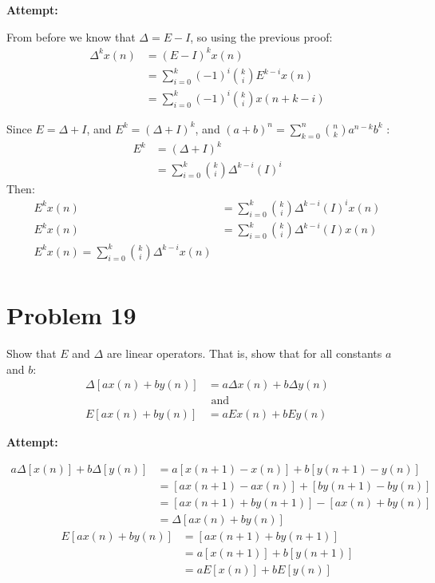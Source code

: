\documentclass[12pt,letterpaper]{article}
\theoremstyle{definition}
\begin{document}
\textbf{Attempt:}
\begin{changemargin}{.5cm}{0cm}
    From before we know that $\Delta = E-I$, so using the previous proof:
    \begin{align*}
        \Delta^kx(n)&=(E-I)^kx(n)\\
        &=\sum_{i=0}^k(-1)^i{k\choose i}E^{k-i}x(n)\\
        &=\sum_{i=0}^k(-1)^i{k\choose i}x(n+k-i)
    \end{align*}

    Since $E=\Delta + I$, and $E^k= (\Delta + I)^k$, and $\displaystyle (a+b)^n = \sum_{k=0}^n {n\choose k} a^{n-k}b^k$ :
    \begin{align*}
        E^k&=(\Delta + I)^k\\
        &=\sum_{i=0}^k{k \choose i} \Delta^{k-i}(I)^i
    \end{align*}
    Then:
    \begin{align*}
        E^kx(n) &=\sum_{i=0}^k{k \choose i} \Delta^{k-i}(I)^ix(n)\\
        E^kx(n) &=\sum_{i=0}^k{k \choose i} \Delta^{k-i}(I)x(n)\\
        E^kx(n) =\sum_{i=0}^k{k \choose i} \Delta^{k-i}x(n)\\
    \end{align*}
\end{changemargin}

\section*{Problem 19}
Show that $E$ and $\Delta$ are linear operators. That is, show that for all constants $a$ and $b$:
\begin{align*}
    \Delta[ax(n)+by(n)] &=a\Delta x(n) + b\Delta y(n)\\
    &\text{ and}\\
    E[ax(n) + by(n)]&= aEx(n) + bEy(n)
\end{align*}

\textbf{Attempt:}

\begin{changemargin}{.5cm}{0cm}
\begin{align*}
    a\Delta[x(n)]+b\Delta[y(n)] &= a[x(n+1) -x(n)] +b[y(n+1)-y(n)]\\
    &=[ax(n+1) -ax(n)] +[by(n+1)-by(n)]\\
    &=[ax(n+1)+by(n+1) ] -[ax(n)+by(n)]\\
    &=\Delta [ax(n)+by(n)]
\end{align*}
\begin{align*}
    E[ax(n) + by(n)]&= [ax(n+1) + by(n+1)]\\
    &=a[x(n+1)]+b[y(n+1)]\\
    &=a E[x(n)]+b E[y(n)]
\end{align*}
    
\end{changemargin}
    
\end{document}
